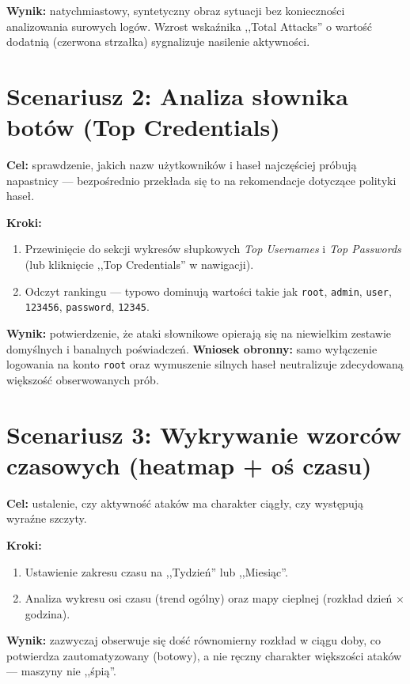 \documentclass[12pt,a4paper]{report}
\begin{document}
\textbf{Wynik:} natychmiastowy, syntetyczny obraz sytuacji bez konieczności
analizowania surowych logów. Wzrost wskaźnika ,,Total Attacks'' o wartość dodatnią
(czerwona strzałka) sygnalizuje nasilenie aktywności.

\section{Scenariusz 2: Analiza słownika botów (Top Credentials)}

\textbf{Cel:} sprawdzenie, jakich nazw użytkowników i haseł najczęściej próbują
napastnicy --- bezpośrednio przekłada się to na rekomendacje dotyczące polityki
haseł.

\textbf{Kroki:}
\begin{enumerate}
  \item Przewinięcie do sekcji wykresów słupkowych \emph{Top Usernames}
        i \emph{Top Passwords} (lub kliknięcie ,,Top Credentials'' w nawigacji).
  \item Odczyt rankingu --- typowo dominują wartości takie jak \texttt{root},
        \texttt{admin}, \texttt{user}, \texttt{123456}, \texttt{password},
        \texttt{12345}.
\end{enumerate}

\textbf{Wynik:} potwierdzenie, że ataki słownikowe opierają się na niewielkim
zestawie domyślnych i banalnych poświadczeń. \textbf{Wniosek obronny:} samo
wyłączenie logowania na konto \texttt{root} oraz wymuszenie silnych haseł
neutralizuje zdecydowaną większość obserwowanych prób.

\section{Scenariusz 3: Wykrywanie wzorców czasowych (heatmap + oś czasu)}

\textbf{Cel:} ustalenie, czy aktywność ataków ma charakter ciągły, czy
występują wyraźne szczyty.

\textbf{Kroki:}
\begin{enumerate}
  \item Ustawienie zakresu czasu na ,,Tydzień'' lub ,,Miesiąc''.
  \item Analiza wykresu osi czasu (trend ogólny) oraz mapy cieplnej
        (rozkład dzień $\times$ godzina).
\end{enumerate}

\textbf{Wynik:} zazwyczaj obserwuje się dość równomierny rozkład w ciągu doby,
co potwierdza zautomatyzowany (botowy), a nie ręczny charakter większości
ataków --- maszyny nie ,,śpią''.
\end{document}
